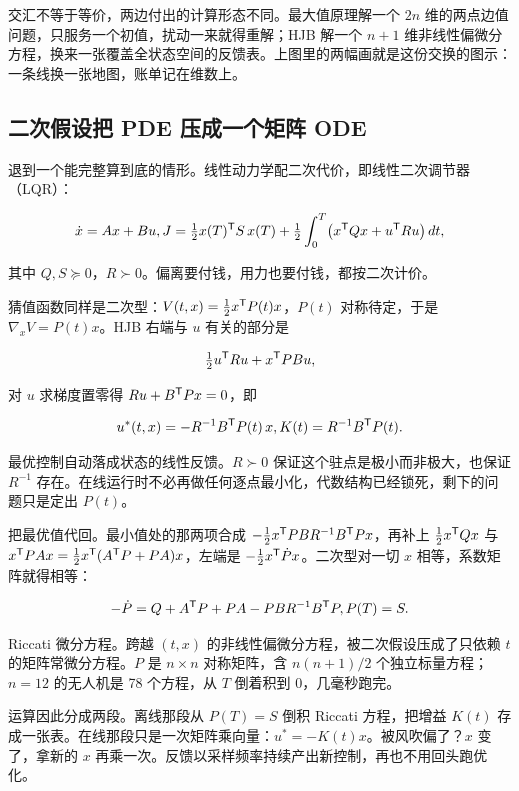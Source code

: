 交汇不等于等价，两边付出的计算形态不同。最大值原理解一个 \(2n\) 维的两点边值问题，只服务一个初值，扰动一来就得重解；HJB 解一个 \(n+1\) 维非线性偏微分方程，换来一张覆盖全状态空间的反馈表。上图里的两幅画就是这份交换的图示：一条线换一张地图，账单记在维数上。

\subsection{二次假设把 PDE 压成一个矩阵 ODE}

退到一个能完整算到底的情形。线性动力学配二次代价，即线性二次调节器（LQR）：

\[
\dot x = Ax + Bu, \space
J = \tfrac12 x(T)^{\mathsf{T}} S\, x(T)
+ \tfrac12 \int_0^T \bigl( x^{\mathsf{T}} Q x + u^{\mathsf{T}} R u \bigr)\, dt,
\]

其中 \(Q, S \succeq 0\)，\(R \succ 0\)。偏离要付钱，用力也要付钱，都按二次计价。

猜值函数同样是二次型：\(V(t,x) = \tfrac12 x^{\mathsf{T}} P(t) x\)，\(P(t)\) 对称待定，于是 \(\nabla_x V = P(t)x\)。HJB 右端与 \(u\) 有关的部分是

\[
\tfrac12 u^{\mathsf{T}} R u + x^{\mathsf{T}} P B u,
\]

对 \(u\) 求梯度置零得 \(Ru + B^{\mathsf{T}}Px = 0\)，即

\[
u^*(t,x) = -R^{-1}B^{\mathsf{T}}P(t)\, x, \space K(t) = R^{-1}B^{\mathsf{T}}P(t).
\]

最优控制自动落成状态的线性反馈。\(R\succ 0\) 保证这个驻点是极小而非极大，也保证 \(R^{-1}\) 存在。在线运行时不必再做任何逐点最小化，代数结构已经锁死，剩下的问题只是定出 \(P(t)\)。

把最优值代回。最小值处的那两项合成 \(-\tfrac12 x^{\mathsf{T}} P B R^{-1} B^{\mathsf{T}} P x\)，再补上 \(\tfrac12 x^{\mathsf{T}}Qx\) 与 \(x^{\mathsf{T}}PAx = \tfrac12 x^{\mathsf{T}}(A^{\mathsf{T}}P + PA)x\)，左端是 \(-\tfrac12 x^{\mathsf{T}}\dot P x\)。二次型对一切 \(x\) 相等，系数矩阵就得相等：

\[
-\dot P = Q + A^{\mathsf{T}}P + PA - P B R^{-1} B^{\mathsf{T}} P, \space P(T) = S.
\]

Riccati 微分方程。跨越 \((t,x)\) 的非线性偏微分方程，被二次假设压成了只依赖 \(t\) 的矩阵常微分方程。\(P\) 是 \(n\times n\) 对称矩阵，含 \(n(n+1)/2\) 个独立标量方程；\(n=12\) 的无人机是 78 个方程，从 \(T\) 倒着积到 \(0\)，几毫秒跑完。

运算因此分成两段。离线那段从 \(P(T)=S\) 倒积 Riccati 方程，把增益 \(K(t)\) 存成一张表。在线那段只是一次矩阵乘向量：\(u^* = -K(t)x\)。被风吹偏了？\(x\) 变了，拿新的 \(x\) 再乘一次。反馈以采样频率持续产出新控制，再也不用回头跑优化。

